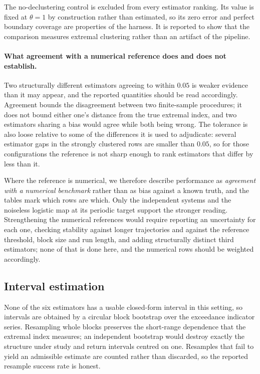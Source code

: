 The no-declustering control is excluded from every estimator ranking. Its value is fixed at \(\theta = 1\) by construction rather than estimated, so its zero error and perfect boundary coverage are properties of the harness. It is reported to show that the comparison measures extremal clustering rather than an artifact of the pipeline.

\paragraph{What agreement with a numerical reference does and does not establish.} Two structurally different estimators agreeing to within \(0.05\) is weaker evidence than it may appear, and the reported quantities should be read accordingly. Agreement bounds the disagreement between two finite-sample procedures; it does not bound either one's distance from the true extremal index, and two estimators sharing a bias would agree while both being wrong. The tolerance is also loose relative to some of the differences it is used to adjudicate: several estimator gaps in the strongly clustered rows are smaller than \(0.05\), so for those configurations the reference is not sharp enough to rank estimators that differ by less than it.

Where the reference is numerical, we therefore describe performance as \emph{agreement with a numerical benchmark} rather than as bias against a known truth, and the tables mark which rows are which. Only the independent systems and the noiseless logistic map at its periodic target support the stronger reading. Strengthening the numerical references would require reporting an uncertainty for each one, checking stability against longer trajectories and against the reference threshold, block size and run length, and adding structurally distinct third estimators; none of that is done here, and the numerical rows should be weighted accordingly.

\subsection{Interval estimation}

None of the six estimators has a usable closed-form interval in this setting, so intervals are obtained by a circular block bootstrap over the exceedance indicator series. Resampling whole blocks preserves the short-range dependence that the extremal index measures; an independent bootstrap would destroy exactly the structure under study and return intervals centred on one. Resamples that fail to yield an admissible estimate are counted rather than discarded, so the reported resample success rate is honest.

